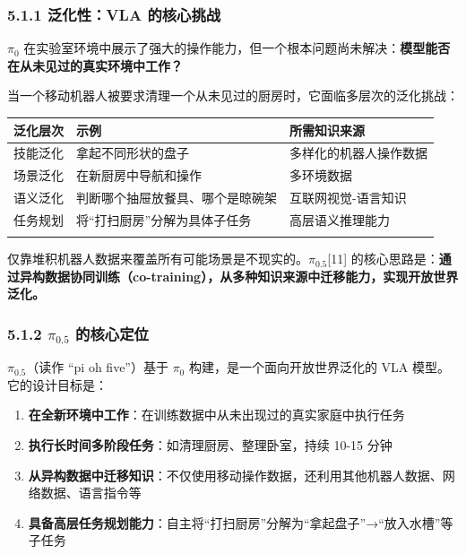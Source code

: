\documentclass[
  chinese,
]{ctexart}
\providecommand{\tightlist}{%
  \setlength{\itemsep}{0pt}\setlength{\parskip}{0pt}}
\begin{document}
\subsubsection{5.1.1 泛化性：VLA
的核心挑战}\label{ux6cdbux5316ux6027vla-ux7684ux6838ux5fc3ux6311ux6218}

\(\pi_0\)
在实验室环境中展示了强大的操作能力，但一个根本问题尚未解决：\textbf{模型能否在从未见过的真实环境中工作？}

当一个移动机器人被要求清理一个从未见过的厨房时，它面临多层次的泛化挑战：

\begin{center}
\begin{tabular}{@{}>{\raggedright\arraybackslash}p{} >{\raggedright\arraybackslash}p{} >{\raggedright\arraybackslash}p{}@{}}
\toprule\noalign{}
泛化层次 & 示例 & 所需知识来源 \\
\midrule\noalign{}
技能泛化 & 拿起不同形状的盘子 & 多样化的机器人操作数据 \\
场景泛化 & 在新厨房中导航和操作 & 多环境数据 \\
语义泛化 & 判断哪个抽屉放餐具、哪个是晾碗架 & 互联网视觉-语言知识 \\
任务规划 & 将``打扫厨房''分解为具体子任务 & 高层语义推理能力 \\
\bottomrule\noalign{}
\end{tabular}
\end{center}

仅靠堆积机器人数据来覆盖所有可能场景是不现实的。\(\pi_{0.5}\){[}11{]}
的核心思路是：\textbf{通过异构数据协同训练（co-training），从多种知识来源中迁移能力，实现开放世界泛化。}

\subsubsection{\texorpdfstring{5.1.2 \(\pi_{0.5}\)
的核心定位}{5.1.2 \textbackslash pi\_\{0.5\} 的核心定位}}\label{pi_0.5-ux7684ux6838ux5fc3ux5b9aux4f4d}

\(\pi_{0.5}\)（读作 ``pi oh five''）基于 \(\pi_0\)
构建，是一个面向开放世界泛化的 VLA 模型。它的设计目标是：

\begin{enumerate}
\def\labelenumi{\arabic{enumi}.}
\tightlist
\item
  \textbf{在全新环境中工作}：在训练数据中从未出现过的真实家庭中执行任务
\item
  \textbf{执行长时间多阶段任务}：如清理厨房、整理卧室，持续 10-15 分钟
\item
  \textbf{从异构数据中迁移知识}：不仅使用移动操作数据，还利用其他机器人数据、网络数据、语言指令等
\item
  \textbf{具备高层任务规划能力}：自主将``打扫厨房''分解为``拿起盘子''→``放入水槽''等子任务
\end{enumerate}
\end{document}
